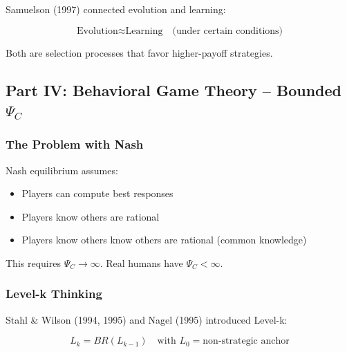 Samuelson (1997) connected evolution and learning:

\begin{equation}
\text{Evolution} \approx \text{Learning} \quad \text{(under certain conditions)}
\end{equation}

Both are selection processes that favor higher-payoff strategies.

\subsection{Part IV: Behavioral Game Theory – Bounded $\Psi_C$}

\subsubsection{The Problem with Nash}

Nash equilibrium assumes:
\begin{itemize}
    \item Players can compute best responses
    \item Players know others are rational
    \item Players know others know others are rational (common knowledge)
\end{itemize}

This requires $\Psi_C \to \infty$. Real humans have $\Psi_C < \infty$.

\subsubsection{Level-k Thinking}

Stahl \& Wilson (1994, 1995) and Nagel (1995) introduced Level-k:

\begin{equation}
\boxed{
L_k = BR(L_{k-1}) \quad \text{with } L_0 = \text{non-strategic anchor}
}
\label{eq:levelk}
\end{equation}

